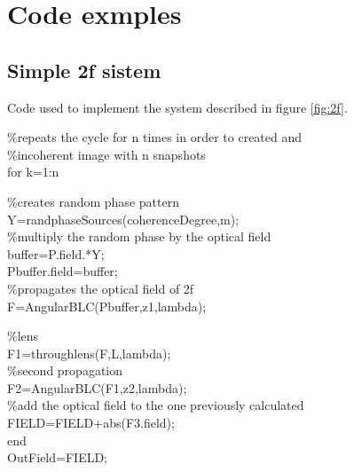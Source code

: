 \chapter*{Code exmples}
\section*{Simple 2f sistem}
Code used to implement the system described in figure \ref{fig:2f}.\\
\begin{listing}

\%repeats the cycle for n times in order to created and\\ \%incoherent image with n snapshots\\
for k=1:n

\%creates random phase pattern\\
Y=randphaseSources(coherenceDegree,m);\\

\%multiply the random phase by the optical field\\

buffer=P.field.*Y;\\
Pbuffer.field=buffer;\\

\%propagates the optical field of 2f \\
F=AngularBLC(Pbuffer,z1,lambda);

\%lens \\
F1=throughlens(F,L,lambda);\\

\%second propagation\\
F2=AngularBLC(F1,z2,lambda);\\


\%add the optical field to the one previously calculated\\
FIELD=FIELD+abs(F3.field);\\

end\\

OutField=FIELD;	\\
\end{listing}

